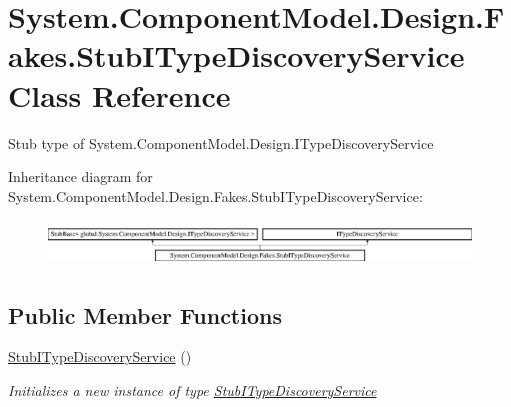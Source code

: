 \hypertarget{class_system_1_1_component_model_1_1_design_1_1_fakes_1_1_stub_i_type_discovery_service}{\section{System.\-Component\-Model.\-Design.\-Fakes.\-Stub\-I\-Type\-Discovery\-Service Class Reference}
\label{class_system_1_1_component_model_1_1_design_1_1_fakes_1_1_stub_i_type_discovery_service}
}


Stub type of System.\-Component\-Model.\-Design.\-I\-Type\-Discovery\-Service 


Inheritance diagram for System.\-Component\-Model.\-Design.\-Fakes.\-Stub\-I\-Type\-Discovery\-Service\-:\begin{figure}[H]
\begin{center}
\leavevmode
\includegraphics[height=1.225383cm]{class_system_1_1_component_model_1_1_design_1_1_fakes_1_1_stub_i_type_discovery_service}
\end{center}
\end{figure}
\subsection*{Public Member Functions}
\begin{DoxyCompactItemize}
\item 
\hyperlink{class_system_1_1_component_model_1_1_design_1_1_fakes_1_1_stub_i_type_discovery_service_acb57ba04bccc120d9705f68443690eb5}{Stub\-I\-Type\-Discovery\-Service} ()
\begin{DoxyCompactList}\small\item\em Initializes a new instance of type \hyperlink{class_system_1_1_component_model_1_1_design_1_1_fakes_1_1_stub_i_type_discovery_service}{Stub\-I\-Type\-Discovery\-Service}\end{DoxyCompactList}\end{DoxyCompactItemize}
